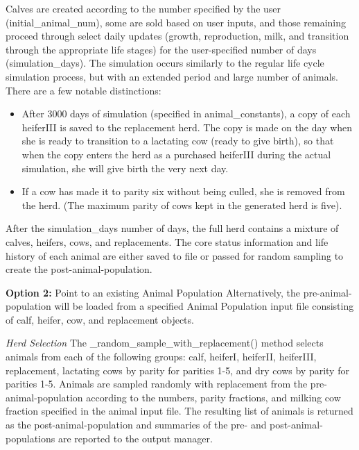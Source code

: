 \documentclass{article}
\begin{document}
\begin{refsection}
Calves are created according to the number specified by the user (initial\_animal\_num), some are sold based on user inputs, and those remaining proceed through select daily updates (growth, reproduction, milk, and transition through the appropriate life stages) for the user-specified number of days (simulation\_days). The simulation occurs similarly to the regular life cycle simulation process, but with an extended period and large number of animals. There are a few notable distinctions:  
\begin{itemize}
    \item After 3000 days of simulation (specified in animal\_constants), a copy of each heiferIII is saved to the replacement herd. The copy is made on the day when she is ready to transition to a lactating cow (ready to give birth), so that when the copy enters the herd as a purchased heiferIII during the actual simulation, she will give birth the very next day. 
    \item If a cow has made it to parity six without being culled, she is removed from the herd. (The maximum parity of cows kept in the generated herd is five). 

\end{itemize}

After the simulation\_days number of days, the full herd contains a mixture of calves, heifers, cows, and replacements. The core status information and life history of each animal are either saved to file or passed for random sampling to create the post-animal-population. 
\vspace{0.2cm}

\textbf{Option 2:} Point to an existing Animal Population
Alternatively, the pre-animal-population will be loaded from a specified Animal Population input file consisting of calf, heifer, cow, and replacement objects. 
\vspace{0.2cm}

\textit{Herd Selection}
The \_random\_sample\_with\_replacement() method selects animals from each of the following groups: calf, heiferI, heiferII, heiferIII, replacement, lactating cows by parity for parities 1-5, and dry cows by parity for parities 1-5. Animals are sampled randomly with replacement from the pre-animal-population according to the numbers, parity fractions, and milking cow fraction specified in the animal input file. The resulting list of animals is returned as the post-animal-population and summaries of the pre- and post-animal-populations are reported to the output manager.




\end{refsection}
\end{document}
